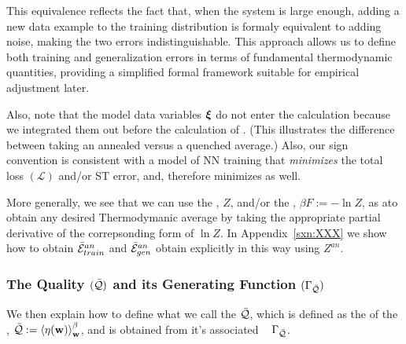 {This equivalence reflects the fact that, when the system is large enough, adding a new data example to the
training distribution is formaly equivalent to adding noise, making the two errors indistinguishable.
This approach allows us to define both training and generalization errors in terms of fundamental thermodynamic quantities,
providing a simplified formal framework suitable for empirical adjustment later.

Also, note that the model data variables $\boldsymbol{\xi}$ do not enter the calculation because we 
integrated them out before the calculation of \ThermalAverage.
(This illustrates the difference between taking an annealed versus a quenched average.)
Also, our sign convention is consistent with a model of NN training that \emph{minimizes} the total loss
$(\mathcal{L})$ and/or ST error, and, therefore minimizes \FreeEnergies as well.

More generally, we see that we can use the \PartitionFunction, $Z$,
and/or the \FreeEnergy, $\beta F:=-\ln Z$, as a\GeneratingFunction to obtain any
desired Thermodymanic average by taking the appropriate partial derivative
of the correpsonding form of $\ln Z$.
In Appendix~\ref{sxn:XXX} we show how to obtain 
$\bar{\mathcal{E}}_{train}^{an}$ and $\bar{\mathcal{E}}_{gen}^{an}$ obtain explicitly in this way using $Z^{an}$.


\subsubsection{The Quality $(\bar{\mathcal{Q}})$ and its Generating Function $(\Gamma_{\bar{\mathcal{Q}}})$}
We then explain how to define what we call the \Quality $\bar{\mathcal{Q}}$, which is
defined as the \ThermalAverage of the \SelfOverlap,  $\bar{\mathcal{Q}}:=\left\langle \eta({\mathbf{w}}) \right\rangle_{\mathbf w}^{\beta}$,
and is obtained from it's associated \emph{\Quality~\GeneratingFunction} $\Gamma_{\bar{\mathcal{Q}}}$.

}
